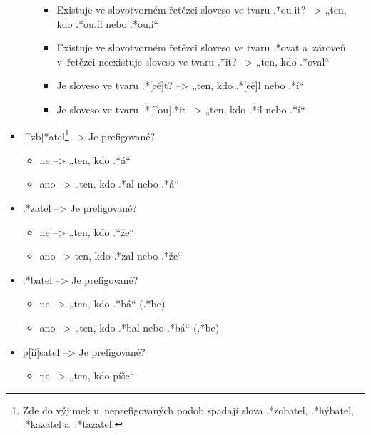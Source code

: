 \begin{itemize}
\begin{itemize}
    \begin{itemize}
    \tightlist
    \item
      Existuje ve slovotvorném řetězci sloveso ve tvaru .*ou.it?
      --\textgreater{} „ten, kdo .*ou.il nebo .*ou.í``
    \item
      Existuje ve slovotvorném řetězci sloveso ve tvaru .*ovat a~zároveň
      v~řetězci neexistuje sloveso ve tvaru .*it? --\textgreater{} „ten,
      kdo .*oval``
    \item
      Je sloveso ve tvaru .*{[}eě{]}t? --\textgreater{} „ten, kdo
      .*{[}eě{]}l nebo .*í``
    \item
      Je sloveso ve tvaru .*{[}\^{}ou{]}.*it --\textgreater{} „ten, kdo
      .*il nebo .*í``
    \end{itemize}
  \end{itemize}
\item
  {[}\^{}zb{]}*atel\footnote{Zde do výjimek u~neprefigovaných podob spadají slova .*zobatel, .*hýbatel, .*kazatel a~.*tazatel.}
  --\textgreater{} Je prefigované?

  \begin{itemize}
  \tightlist
  \item
    ne --\textgreater{} „ten, kdo .*á``
  \item
    ano --\textgreater{} „ten, kdo .*al nebo .*á``
  \end{itemize}
\item
  .*zatel --\textgreater{} Je prefigované?

  \begin{itemize}
  \tightlist
  \item
    ne --\textgreater{} „ten, kdo .*že``
  \item
    ano --\textgreater{} ten, kdo .*zal nebo .*že``
  \end{itemize}
\item
  .*batel --\textgreater{} Je prefigované?

  \begin{itemize}
  \tightlist
  \item
    ne --\textgreater{} „ten, kdo .*bá`` (.*be)
  \item
    ano --\textgreater{} „ten, kdo .*bal nebo .*bá`` (.*be)
  \end{itemize}
\item
  p{[}ií{]}satel --\textgreater{} Je prefigované?

  \begin{itemize}
  \tightlist
  \item
    ne --\textgreater{} „ten, kdo píše``
  \end{itemize}
\end{itemize}

